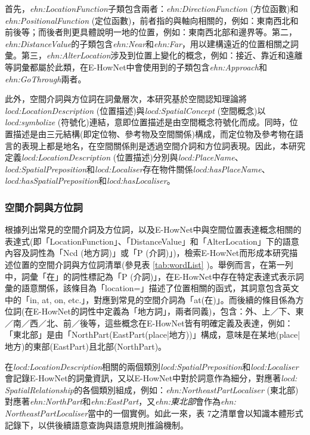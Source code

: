 首先，\textit{ehn:LocationFunction}子類包含兩者：\textit{ehn:DirectionFunction} (方位函數)和\textit{ehn:PositionalFunction} (定位函數)，前者指的與軸向相關的，例如：東南西北和前後等；而後者則更具體說明一地的位置，例如：東南西北部和邊界等。第二，\textit{ehn:DistanceValue}的子類包含\textit{ehn:Near}和\textit{ehn:Far}，用以建構遠近的位置相關之詞彙。第三，\textit{ehn:AlterLocation}涉及到位置上變化的概念，例如：接近、靠近和遠離等詞彙都屬於此類，在E-HowNet中會使用到的子類包含\textit{ehn:Approach}和\textit{ehn:GoThrough}兩者。

此外，空間介詞與方位詞在詞彙層次，本研究基於空間認知理論將\textit{locd:LocationDescription} (位置描述)與\textit{locd:SpatialConcept} (空間概念)以\textit{locd:symbolize} (符號化)連結，意即位置描述是由空間概念符號化而成。同時，位置描述是由三元結構(即定位物、參考物及空間關係)構成，而定位物及參考物在語言的表現上都是地名，在空間關係則是透過空間介詞和方位詞表現。因此，本研究定義\textit{locd:LocationDescription} (位置描述)分別與\textit{locd:PlaceName}、\textit{locd:SpatialPreposition}和\textit{locd:Localiser}存在物件關係\textit{locd:hasPlaceName}、\textit{locd:hasSpatialPreposition}和\textit{locd:hasLocaliser}。

\subsubsection{空間介詞與方位詞}

根據\textcite{RN45}列出常見的空間介詞及方位詞，以及E-HowNet中與空間位置表達概念相關的表達式(即「LocationFunction」、「DistanceValue」和「AlterLocation」下的語意內容及詞性為「Ncd (地方詞)」或「P (介詞)」)，檢索E-HowNet而形成本研究描述位置的空間介詞與方位詞清單(參見表 \ref{tab:wordList} )。舉例而言，在第一列中，詞彙「在」的詞性標記為「P (介詞)」，在E-HowNet中存在特定表達式表示詞彙的語意關係，該條目為「location={}」描述了位置相關的函式，其詞意包含英文中的「in, at, on, etc.」，對應到常見的空間介詞為「at(在)」。而後續的條目係為方位詞(在E-HowNet的詞性中定義為「地方詞」，兩者同義)，包含：外、上／下、東／南／西／北、前／後等，這些概念在E-HowNet皆有明確定義及表達，例如：「東北部」是由「{NorthPart({EastPart({place|地方})})}」構成，意味是在某地(place|地方)的東部(EastPart)且北部(NorthPart)。



在\textit{locd:LocationDescription}相關的兩個類別\textit{locd:SpatialPreposition}和\textit{locd:Localiser}會記錄E-HowNet的詞彙資訊，又以E-HowNet中對於詞意作為細分，對應著\textit{locd: SpatialRelationship}的各個類別組成，例如：\textit{ehn:NortheastPartLocaliser} (東北部)對應著\textit{ehn:NorthPart}和\textit{ehn:EastPart}，又\textit{ehn:東北部}會作為\textit{ehn: NortheastPartLocaliser}當中的一個實例。如此一來，表 7之清單會以知識本體形式記錄下，以供後續語意查詢與語意規則推論機制。

